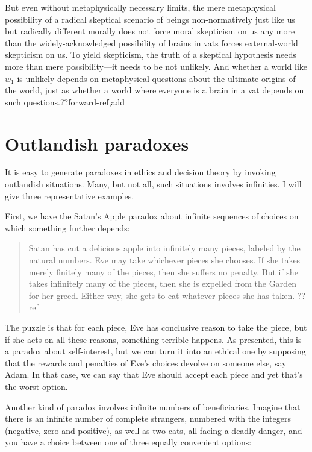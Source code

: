 But even without metaphysically necessary limits, the mere metaphysical possibility of a radical skeptical 
scenario of  beings non-normatively just like us but radically different morally does not force moral 
skepticism  on us any more than the widely-acknowledged possibility of brains in vats forces external-world 
skepticism on us. To yield skepticism, the truth of a skeptical hypothesis needs more than mere possibility---it
needs to be not unlikely. And whether a world like $w_1$ is unlikely depends on metaphysical questions about 
the ultimate origins of the world, just as whether a world where everyone is a brain in a vat depends on such 
questions.??forward-ref,add 

\section{Outlandish paradoxes}
It is easy to generate paradoxes in ethics and decision theory by invoking outlandish situations.
Many, but not all, such situations involves infinities. I will give three representative examples.

First, we have the Satan's Apple paradox about infinite sequences of choices on which something
further depends:
\begin{quote}
Satan has cut a delicious apple into infinitely many pieces, labeled by the natural numbers. Eve
may take whichever pieces she chooses. If she takes merely finitely many of the pieces, then she
suffers no penalty. But if she takes infinitely many of the pieces, then she is expelled from the
Garden for her greed. Either way, she gets to eat whatever pieces she has taken. ??ref
\end{quote}
The puzzle is that for each piece, Eve has conclusive reason to take the piece, but if she acts on
all these reasons, something terrible happens. As presented, this is a paradox about self-interest, 
but we can turn it into an ethical one by supposing that the rewards and penalties of Eve's choices 
devolve on someone else, say Adam. In that case, we can say that Eve should accept each piece and yet
that's the worst option.

Another kind of paradox involves infinite numbers of beneficiaries. Imagine that there is an infinite
number of complete strangers, numbered with the integers (negative, zero and positive),
as well as two cats, all facing a deadly danger, and you have a choice between one of three equally convenient options:

